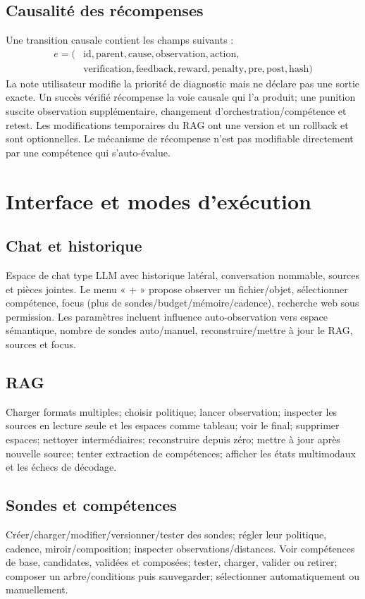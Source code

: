 \documentclass[11pt,a4paper]{report}
\begin{document}
\section{Causalité des récompenses}Une transition causale contient les champs suivants :
\begin{equation*}
\begin{aligned}
e = (&\mathrm{id},\mathrm{parent},\mathrm{cause},\mathrm{observation},\mathrm{action},\\
     &\mathrm{verification},\mathrm{feedback},\mathrm{reward},\mathrm{penalty},\mathrm{pre},\mathrm{post},\mathrm{hash})
\end{aligned}
\end{equation*}
La note utilisateur modifie la priorité de diagnostic mais ne déclare pas une sortie exacte. Un succès vérifié récompense la voie causale qui l'a produit; une punition suscite observation supplémentaire, changement d'orchestration/compétence et retest. Les modifications temporaires du RAG ont une version et un rollback et sont optionnelles. Le mécanisme de récompense n'est pas modifiable directement par une compétence qui s'auto-évalue.

\chapter{Interface et modes d'exécution}
\section{Chat et historique}Espace de chat type LLM avec historique latéral, conversation nommable, sources et pièces jointes. Le menu « + » propose observer un fichier/objet, sélectionner compétence, focus (plus de sondes/budget/mémoire/cadence), recherche web sous permission. Les paramètres incluent influence auto-observation vers espace sémantique, nombre de sondes auto/manuel, reconstruire/mettre à jour le RAG, sources et focus.
\section{RAG}Charger formats multiples; choisir politique; lancer observation; inspecter les sources en lecture seule et les espaces comme tableau; voir le final; supprimer espaces; nettoyer intermédiaires; reconstruire depuis zéro; mettre à jour après nouvelle source; tenter extraction de compétences; afficher les états multimodaux et les échecs de décodage.
\section{Sondes et compétences}Créer/charger/modifier/versionner/tester des sondes; régler leur politique, cadence, miroir/composition; inspecter observations/distances. Voir compétences de base, candidates, validées et composées; tester, charger, valider ou retirer; composer un arbre/conditions puis sauvegarder; sélectionner automatiquement ou manuellement.
\end{document}
